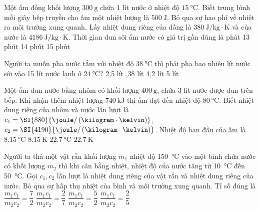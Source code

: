 \begin{ex}
	Một ấm đồng khối lượng $\SI{300}{\gram}$ chứa 1 lít nước ở nhiệt độ $\SI{15}{\celsius}$. Biết trung bình mỗi giây bếp truyền cho ấm một nhiệt lượng là $\SI{500}{\joule}$. Bỏ qua sự hao phí về nhiệt ra môi trường xung quanh. Lấy nhiệt dung riêng của đồng là $\SI{380}{\joule/\kilogram\cdot\kelvin}$ và của nước là $\SI{4186}{\joule/\kilogram\cdot\kelvin}$. Thời gian đun sôi ấm nước có giá trị gần đúng là
	\choice
	{ phút}
	{13 phút}
	{14 phút}
	{15 phút}
\end{ex}
\begin{ex}
	Người ta muốn pha nước tắm với nhiệt độ $\SI{38}{\celsius}$ thì phải pha bao nhiêu lít nước sôi vào 15 lít nước lạnh ở $\SI{24}{\celsius}$?
	\choice
	{2,5 lít}
	{,38 lít}
	{4,2 lít}
	{5 lít}
\end{ex}
\begin{ex}
	Một ấm đun nước bằng nhôm có khối lượng $\SI{400}{\gram}$, chứa 3 lít nước được đun trên bếp. Khi nhận thêm nhiệt lượng $\SI{740}{\kilo\joule}$ thì ấm đạt đến nhiệt độ $\SI{80}{\celsius}$. Biết nhiệt dung riêng của nhôm và nước lần lượt là $c_1=\SI{880}{\joule/\left(\kilogram\cdot\kelvin\right)}$, $c_2=\SI{4190}{\joule/\left(\kilogram\cdot\kelvin\right)}$. Nhiệt độ ban đầu của ấm là
	\choice
	{$\SI{8.15}{\celsius}$}
	{$\SI{8.15}{\kelvin}$}
	{\True $\SI{22.7}{\celsius}$}
	{$\SI{22.7}{\kelvin}$}
\end{ex}
\begin{ex}
	Người ta thả một vật rắn khối lượng $m_{1}$ nhiệt độ \SI{150}{\celsius} vào một bình chứa nước có khối lượng $m_{2}$ thì khi cân bằng nhiệt, nhiệt độ của nước tăng từ \SI{10}{\celsius} đến \SI{50}{\celsius}. Gọi $c_{1}, c_{2}$ lần lượt là nhiệt dung riêng của vật rắn và nhiệt dung riêng của nước. Bỏ qua sự hấp thụ nhiệt của bình và môi trường xung quanh. Tỉ số đúng là
	\choice
	{$\dfrac{m_{1} c_{1}}{m_{2} c_{2}}=\dfrac{7}{2}$}
	{$\dfrac{m_{1} c_{1}}{m_{2} c_{2}}=\dfrac{2}{7}$}
	{$\dfrac{m_{1} c_{1}}{m_{2} c_{2}}=\dfrac{5}{2}$}
	{\True $\dfrac{m_{1} c_{1}}{m_{2} c_{2}}=\dfrac{2}{5}$}
	\loigiai{}
\end{ex}
